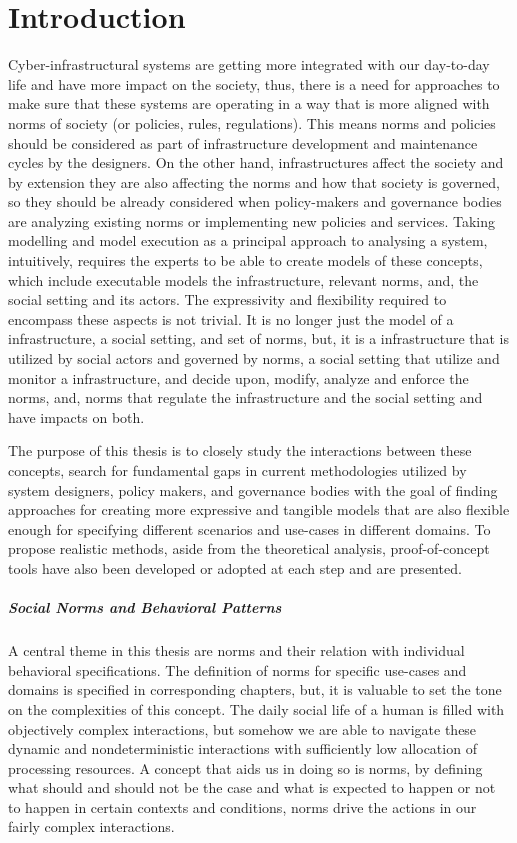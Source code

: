 \chapter{Introduction}
Cyber-infrastructural systems are getting more integrated with our day-to-day life and have more impact on the society, thus, there is a need for approaches to make sure that these systems are operating in a way that is more aligned with norms of society (or policies, rules, regulations). This means norms and policies should be considered as part of infrastructure development and maintenance cycles by the designers. On the other hand, infrastructures affect the society and by extension they are also affecting the norms and how that society is governed, so they should be already considered when policy-makers and governance bodies are analyzing existing norms or implementing new policies and services. Taking modelling and model execution as a principal approach to analysing a system, intuitively, requires the experts to be able to create models of these concepts, which include executable models the infrastructure, relevant norms, and, the social setting and its actors. The expressivity and flexibility required to encompass these aspects is not trivial. It is no longer just the model of a infrastructure, a social setting, and set of norms, but, it is a infrastructure that is utilized by social actors and governed by norms, a social setting that utilize and monitor a infrastructure, and decide upon, modify, analyze and enforce the norms, and, norms that regulate the infrastructure and the social setting and have impacts on both.


The purpose of this thesis is to closely study the interactions between these concepts, search for fundamental gaps in current methodologies utilized by system designers, policy makers, and governance bodies with the goal of finding approaches for creating more expressive and tangible models that are also flexible enough for specifying different scenarios and use-cases in different domains. To propose realistic methods, aside from the theoretical analysis, proof-of-concept tools have also been developed or adopted at each step and are presented.


\paragraph{Social Norms and Behavioral Patterns}
A central theme in this thesis are norms and their relation with individual behavioral specifications. The definition of norms for specific use-cases and domains is specified in corresponding chapters, but, it is valuable to set the tone on the complexities of this concept. The daily social life of a human is filled with objectively complex interactions, but somehow we are able to navigate these dynamic and nondeterministic interactions with sufficiently low allocation of processing resources. A concept that aids us in doing so is norms, by defining what should and should not be the case and what is expected to happen or not to happen in certain contexts and conditions, norms drive the actions in our fairly complex interactions. 


